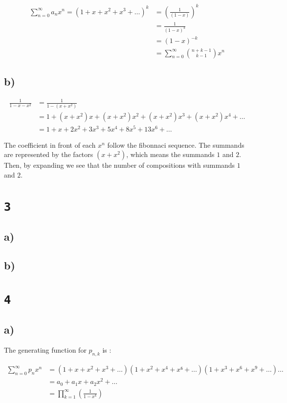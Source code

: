 \documentclass[a4paper,11pt]{report}
\begin{document}
\begin{align*}
  \sum_{n=0}^\infty a_n x^n = (1 + x + x^2 + x^3 + \dots)^k
  &= (\frac{1}{(1-x)})^k \\
  &= \frac{1}{(1-x)^k} \\
  &= (1-x)^{-k} \\
  &= \sum_{n=0}^\infty \binom{n+k-1}{k-1} x^n
\end{align*}

\subsection*{b)}

\begin{align*}
  \frac{1}{1-x-x^2} &= \frac{1}{1-(x+x^2)} \\
                    &= 1 + (x+x^2)x + (x+x^2)x^2 + (x+x^2)x^3 + (x+x^2)x^4 + \dots \\
                    &= 1 + x + 2x^2 + 3x^3 + 5x^4 + 8x^5 + 13x^6 + \dots
\end{align*}

The coefficient in front of each $x^n$ follow the fibonnaci sequence. The
summands are represented by the factors $(x + x^2)$, which means the summands
$1$ and $2$. Then, by expanding we see that the number of compositions with
summands $1$ and $2$.


\section*{\texttt{3}}

\subsection*{a)}

\subsection*{b)}


\section*{\texttt{4}}

\subsection*{a)}

The generating function for $p_{n,k}$ is :

\begin{align*}
  \sum_{n=0}^\infty p_n x^n
  &= (1 + x + x^2 + x^3 + \dots)(1 + x^2 + x^4 + x ⁶ + \dots)(1 + x^3 + x^6 + x^9 + \dots)\dots \\
  &= a_0 + a_1x + a_2x^2 + \dots \\
  &= \prod_{k=1}^\infty (\frac{1}{1 - x^k}) \\
\end{align*}
\end{document}
